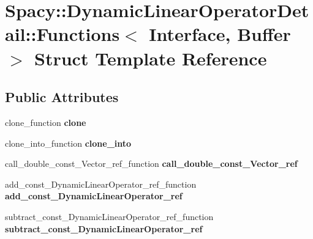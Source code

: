 \hypertarget{structSpacy_1_1DynamicLinearOperatorDetail_1_1Functions}{\section{\-Spacy\-:\-:\-Dynamic\-Linear\-Operator\-Detail\-:\-:\-Functions$<$ \-Interface, \-Buffer $>$ \-Struct \-Template \-Reference}
\label{structSpacy_1_1DynamicLinearOperatorDetail_1_1Functions}
}
\subsection*{\-Public \-Attributes}
\begin{DoxyCompactItemize}
\item 
\hypertarget{structSpacy_1_1DynamicLinearOperatorDetail_1_1Functions_a6c54ee101c1f2117f08c7774e0abcb87}{clone\-\_\-function {\bfseries clone}}\label{structSpacy_1_1DynamicLinearOperatorDetail_1_1Functions_a6c54ee101c1f2117f08c7774e0abcb87}

\item 
\hypertarget{structSpacy_1_1DynamicLinearOperatorDetail_1_1Functions_a5aef856a202630f1fc2b9dec9295d366}{clone\-\_\-into\-\_\-function {\bfseries clone\-\_\-into}}\label{structSpacy_1_1DynamicLinearOperatorDetail_1_1Functions_a5aef856a202630f1fc2b9dec9295d366}

\item 
\hypertarget{structSpacy_1_1DynamicLinearOperatorDetail_1_1Functions_ace9f43b81f1d39d57f80753145f0a7e2}{call\-\_\-double\-\_\-const\-\_\-\-Vector\-\_\-ref\-\_\-function {\bfseries call\-\_\-double\-\_\-const\-\_\-\-Vector\-\_\-ref}}\label{structSpacy_1_1DynamicLinearOperatorDetail_1_1Functions_ace9f43b81f1d39d57f80753145f0a7e2}

\item 
\hypertarget{structSpacy_1_1DynamicLinearOperatorDetail_1_1Functions_a85b2f8b5c9df6f2f7faa85a7e6d94c7a}{add\-\_\-const\-\_\-\-Dynamic\-Linear\-Operator\-\_\-ref\-\_\-function {\bfseries add\-\_\-const\-\_\-\-Dynamic\-Linear\-Operator\-\_\-ref}}\label{structSpacy_1_1DynamicLinearOperatorDetail_1_1Functions_a85b2f8b5c9df6f2f7faa85a7e6d94c7a}

\item 
\hypertarget{structSpacy_1_1DynamicLinearOperatorDetail_1_1Functions_a6363a9b7fec768be3de9881929126405}{subtract\-\_\-const\-\_\-\-Dynamic\-Linear\-Operator\-\_\-ref\-\_\-function {\bfseries subtract\-\_\-const\-\_\-\-Dynamic\-Linear\-Operator\-\_\-ref}}\label{structSpacy_1_1DynamicLinearOperatorDetail_1_1Functions_a6363a9b7fec768be3de9881929126405}


\end{DoxyCompactItemize}
